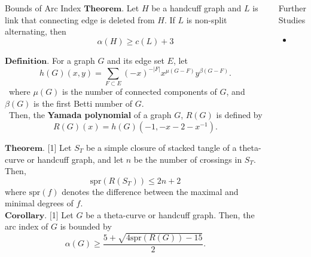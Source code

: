\documentclass[final]{beamer}
\begin{document}
\begin{frame}[t]
\begin{columns}[t]
\begin{block}{Bounds of Arc Index}
  $\mathbf{Theorem.}$ Let $H$ be a handcuff graph and $L$ is link that connecting edge is deleted from $H$. If $L$ is non-split alternating, then 
  \begin{equation*}
    \alpha(H) \geq c(L) + 3
  \end{equation*}

    $\mathbf{Definition.}$ For a graph $G$ and its edge set $E$, let
    \[ h(G)(x, y) = \sum_{F \subset E} (-x)^{-|F|} x^{\mu(G-F)} y^{\beta(G-F)}. \]
    \ where $\mu(G)$ is the number of connected components of $G$, and $\beta(G)$ is the first Betti number of $G$. \\
    \ Then, the \textbf{Yamada polynomial} of a graph $G$, $R(G)$ is defined by
    \[ R(G)(x) = h(G)(-1, -x-2-x^{-1}). \]



    
    $\mathbf{Theorem.}$ $[$1$]$ Let $S_T$ be a simple closure of stacked tangle of a theta-curve or handcuff graph, and let $n$ be the number of crossings in $S_T$. Then,
     \[ \mathrm{spr}(R(S_T)) \leq 2n+2 \]
     where $\mathrm{spr}(f)$ denotes the difference between the maximal and minimal degrees of $f$. \\


    $\mathbf{Corollary.}$ $[$1$]$ Let $G$ be a theta-curve or handcuff graph. Then, the arc index of $G$ is bounded by
      \[ \alpha(G) \geq \frac{5 + \sqrt{4 \mathrm{spr}(R(G)) - 15}}{2}. \]
  \end{block}

  \begin{block}{Further Studies}
    \begin{itemize}
      \item 
    \end{itemize}
  \end{block}


\end{columns}
\end{frame}
\end{document}
